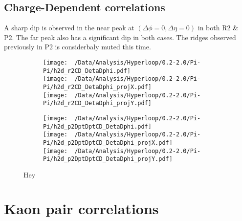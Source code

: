 \documentclass[12pt,a4paper,twoside]{report}
\begin{document}
\subsection{Charge-Dependent correlations}
A sharp dip is observed in the near peak at $(\Delta\phi=0,\Delta\eta=0)$ in both R2 \& P2. The far peak also has a significant dip in both cases. The ridges observed previously in P2 is considerbaly muted this time.
\begin{figure}[H]
	\begin{subfigure}{0.49\linewidth}
		\texttt{[image: ~/Data/Analysis/Hyperloop/0.2-2.0/Pi-Pi/h2d\_r2CD\_DetaDphi.pdf]}\\
		\texttt{[image: ~/Data/Analysis/Hyperloop/0.2-2.0/Pi-Pi/h2d\_r2CD\_DetaDphi\_projX.pdf]}\\
		\texttt{[image: ~/Data/Analysis/Hyperloop/0.2-2.0/Pi-Pi/h2d\_r2CD\_DetaDphi\_projY.pdf]}\\
	\end{subfigure}
	\begin{subfigure}{0.49\linewidth}
		\texttt{[image: ~/Data/Analysis/Hyperloop/0.2-2.0/Pi-Pi/h2d\_p2DptDptCD\_DetaDphi.pdf]}\\
		\texttt{[image: ~/Data/Analysis/Hyperloop/0.2-2.0/Pi-Pi/h2d\_p2DptDptCD\_DetaDphi\_projX.pdf]}\\
		\texttt{[image: ~/Data/Analysis/Hyperloop/0.2-2.0/Pi-Pi/h2d\_p2DptDptCD\_DetaDphi\_projY.pdf]}\\
	\end{subfigure}
	\caption{Hey}
\end{figure}
\section{Kaon pair correlations}
\end{document}
